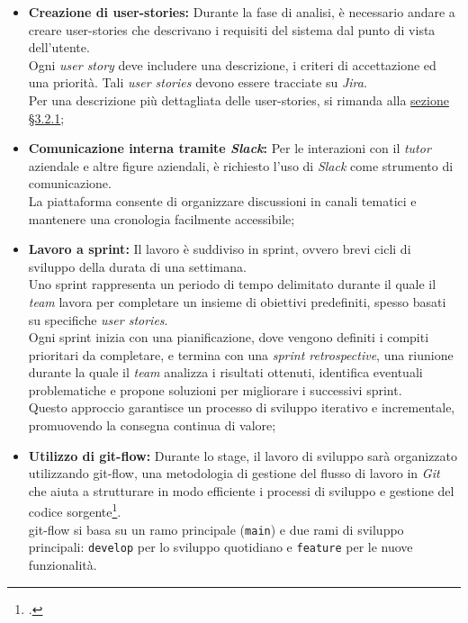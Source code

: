 \begin{itemize}
    \item \textbf{Creazione di \gls{user-stories}:} Durante la fase di analisi, è necessario andare a creare \gls{user-stories} che descrivano i requisiti del sistema dal punto di vista dell’utente.\\
    Ogni \textit{user story} deve includere una descrizione, i criteri di accettazione ed una priorità.
    Tali \textit{user stories} devono essere tracciate su \textit{Jira}.\\
    Per una descrizione più dettagliata delle \gls{user-stories}, si rimanda alla \hyperref[subsec:user-story-mapping]{sezione §3.2.1};
    \item \textbf{Comunicazione interna tramite \textit{Slack}:} Per le interazioni con il \textit{tutor} aziendale e altre figure aziendali, è richiesto l’uso di \textit{Slack} come strumento di comunicazione.\\
    La piattaforma consente di organizzare discussioni in canali tematici e mantenere una cronologia facilmente accessibile;
    \item \textbf{Lavoro a \gls{sprint}:} Il lavoro è suddiviso in \gls{sprint}, ovvero brevi cicli di sviluppo della durata di una settimana.\\
    Uno \gls{sprint} rappresenta un periodo di tempo delimitato durante il quale il \textit{team} lavora per completare un insieme di obiettivi predefiniti, spesso basati su specifiche \textit{user stories}. \\
    Ogni \gls{sprint} inizia con una pianificazione, dove vengono definiti i compiti prioritari da completare, e termina con una \textit{sprint retrospective}, 
    una riunione durante la quale il \textit{team} analizza i risultati ottenuti, identifica eventuali problematiche e propone soluzioni per migliorare i successivi \gls{sprint}. \\
    Questo approccio garantisce un processo di sviluppo iterativo e incrementale, promuovendo la consegna continua di valore;
    \item \textbf{Utilizzo di \gls{git-flow}:} Durante lo stage, il lavoro di sviluppo sarà organizzato utilizzando \gls{git-flow}, una metodologia di gestione del flusso di lavoro in \textit{Git} che aiuta a strutturare in modo efficiente i processi di sviluppo e gestione del codice sorgente\footcite{site:git-flow}.\\
    \gls{git-flow} si basa su un ramo principale (\texttt{main}) e due rami di sviluppo principali: \texttt{develop} per lo sviluppo quotidiano e \texttt{feature} per le nuove funzionalità.\\

\end{itemize}

